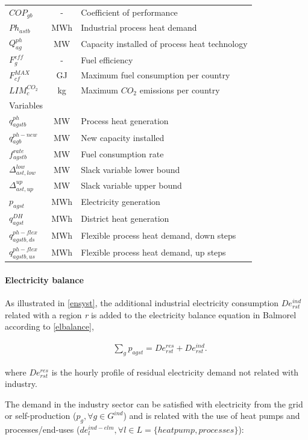 \documentclass[review]{elsarticle}
\begin{document}
\begin{table}[H]
\begin{tabular}{lcl}
$COP_{gb}$ & - & Coefficient of performance \\
$Ph_{astb}$ & MWh & Industrial process heat demand \\
$Q^{ph}_{ag}$ & MW & Capacity installed of process heat technology \\
$F^{eff}_{g}$ & - & Fuel efficiency \\
$F^{MAX}_{cf}$ & GJ & Maximum fuel consumption per country\\
$LIM^{CO_2}_c$ & kg & Maximum $CO_2$ emissions per country \\
\hline
Variables  & &  \\ \hline
$q^{ph}_{agstb}$ & MW & Process heat generation \\
$q^{ph-new}_{agb}$ & MW & New capacity installed \\
$f^{rate}_{agstb}$ & MW & Fuel consumption rate \\
$\Delta^{low}_{ast,low}$ & MW & Slack variable lower bound \\
$\Delta^{up}_{ast,up}$ & MW & Slack variable upper bound \\
$p_{agst}$ & MWh & Electricity generation \\
$q^{DH}_{agst}$ & MWh & District heat generation \\
$q^{ph-flex}_{agstb,ds}$ & MWh & Flexible process heat demand, down steps\\
$q^{ph-flex}_{agstb,us}$ & MWh & Flexible process heat demand, up steps\\

\end{tabular}
\end{table}


\paragraph{Electricity balance}
As illustrated in \autoref{ensyst}, the additional industrial electricity consumption $De^{ind}_{rst}$ related with a region \textit{r} is added to the electricity balance equation in Balmorel according to \autoref{elbalance},

\begin{align}
& \sum_{g} p_{agst} = De^{res}_{rst} + De^{ind}_{rst} \label{elbalance}.
\end{align}

where $De^{res}_{rst}$ is the hourly profile of residual electricity demand not related with industry.

The demand in the industry sector can be satisfied with electricity from the grid or self-production ($p_g, \forall g \in G^{ind}$) and is related with the use of heat pumps and processes/end-uses ($de^{ind-elm}_l, \forall l \in L=\{heat pump, processes\}$):
\end{document}
